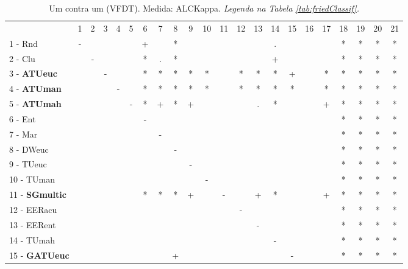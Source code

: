 \begin{table}[h]
\caption{Um contra um (VFDT). Medida: ALCKappa. \textit{Legenda na Tabela \ref{tab:friedClassif}.}}
\begin{center}\begin{tabular}{lcc|cc|cc|cc|cc|cc|cc|cc|cc|cc|c}
 			& 1 & 2 & 3 & 4 & 5 & 6 & 7 & 8 & 9 & 10 & 11 & 12 & 13 & 14 & 15 & 16 & 17 & 18 & 19 & 20 & 21\\
1 - Rnd  	& - &   &   &   &   & + &   & * &   &   &   &   &   & . &   &   &   & * & * & * & * \\
2 - Clu  	&   & - &   &   &   & * & . & * &   &   &   &   &   & + &   &   &   & * & * & * & * \\ \hline
3 - \textbf{ATUeuc}	&   &   & - &   &   & * & * & * & * & * &   & * & * & * & + &   & * & * & * & * & * \\
4 - \textbf{ATUman}	&   &   &   & - &   & * & * & * & * & * &   & * & * & * & * &   & * & * & * & * & * \\ \hline
5 - \textbf{ATUmah}	&   &   &   &   & - & * & + & * & + &   &   &   & . & * &   &   & + & * & * & * & * \\
6 - Ent  	&   &   &   &   &   & - &   &   &   &   &   &   &   &   &   &   &   & * & * & * & * \\ \hline
7 - Mar  	&   &   &   &   &   &   & - &   &   &   &   &   &   &   &   &   &   & * & * & * & * \\
8 - DWeuc	&   &   &   &   &   &   &   & - &   &   &   &   &   &   &   &   &   & * & * & * & * \\ \hline
9 - TUeuc	&   &   &   &   &   &   &   &   & - &   &   &   &   &   &   &   &   & * & * & * & * \\
10 - TUman	&   &   &   &   &   &   &   &   &   & - &   &   &   &   &   &   &   & * & * & * & * \\ \hline
11 - \textbf{SGmultic}	&   &   &   &   &   & * & * & * & + &   & - &   & + & * &   &   & + & * & * & * & * \\
12 - EERacu	&   &   &   &   &   &   &   &   &   &   &   & - &   &   &   &   &   & * & * & * & * \\ \hline
13 - EERent	&   &   &   &   &   &   &   &   &   &   &   &   & - &   &   &   &   & * & * & * & * \\
14 - TUmah	&   &   &   &   &   &   &   &   &   &   &   &   &   & - &   &   &   & * & * & * & * \\ \hline
15 - \textbf{GATUeuc}	&   &   &   &   &   &   &   & + &   &   &   &   &   &   & - &   &   & * & * & * & * \\

\end{tabular}
\end{center}
\end{table}
